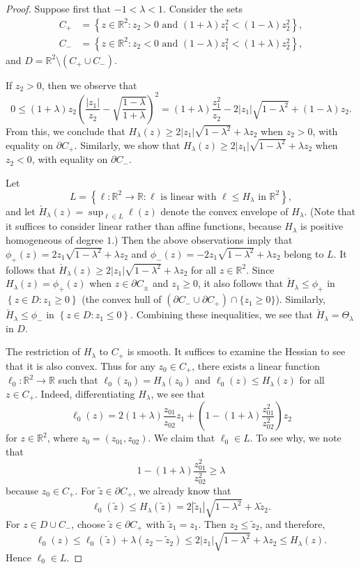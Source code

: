 \documentclass[a4paper]{article}
\newcommand{\R}{\mathbb{R}}
\newcommand{\set}[2]{\left\{ #1 \colon #2 \right\}}
\theoremstyle{definition}
\theoremstyle{remark}
\begin{document}
\begin{proof}
Suppose first that $-1 < \lambda < 1$. Consider the sets
\begin{align*}
C_+ & = \set{z \in \R^2}{z_2 > 0 \text{ and }(1 + \lambda) z_1^2 < (1 - \lambda) z_2^2}, \\
C_- & = \set{z \in \R^2}{z_2 < 0 \text{ and } (1 - \lambda) z_1^2 < (1 + \lambda) z_2^2},
\end{align*}
and $D = \R^2 \setminus (C_+ \cup C_-)$.

If $z_2 > 0$, then we observe that
\[
0 \le (1 + \lambda) z_2 \left(\frac{|z_1|}{z_2} - \sqrt{\frac{1 - \lambda}{1 + \lambda}}\right)^2 = (1 + \lambda) \frac{z_1^2}{z_2} - 2|z_1| \sqrt{1 - \lambda^2} + (1 - \lambda)z_2.
\]
From this, we conclude that
$H_\lambda(z) \ge 2|z_1|\sqrt{1 - \lambda^2} + \lambda z_2$ when $z_2 > 0$,
with equality on $\partial C_+$.
Similarly, we show that
$H_\lambda(z) \ge 2|z_1|\sqrt{1 - \lambda^2} + \lambda z_2$ when $z_2 < 0$,
with equality on $\partial C_-$.

Let
\[
L = \set{\ell \colon \R^2 \to \R}{\ell \text{ is linear with } \ell \le H_\lambda \text{ in } \R^2},
\]
and let $\check{H}_\lambda(z) = \sup_{\ell \in L} \ell(z)$
denote the convex envelope of $H_\lambda$. (Note that it suffices to consider
linear rather than affine functions, because $H_\lambda$ is positive homogeneous of degree $1$.)
Then the above observations imply that $\phi_+(z) = 2z_1 \sqrt{1 - \lambda^2} + \lambda z_2$ and $\phi_-(z) = -2z_1 \sqrt{1 - \lambda^2} + \lambda z_2$
belong to $L$. It follows that $\check{H}_\lambda(z) \ge 2|z_1|\sqrt{1 - \lambda^2} + \lambda z_2$ for all $z \in \R^2$.
Since $H_\lambda(z) = \phi_+(z)$ when $z \in \partial C_{\pm}$ and $z_1 \ge 0$,
it also follows that $\check{H}_\lambda \le \phi_+$ in $\set{z \in D}{z_1 \ge 0}$ (the convex hull of
$(\partial C_- \cup \partial C_+) \cap \{z_1 \ge 0\}$). Similarly,
$\check{H}_\lambda \le \phi_-$ in $\set{z \in D}{z_1 \le 0}$.
Combining these inequalities, we see that $\check{H}_\lambda = \Theta_\lambda$ in $D$.

The restriction of $H_\lambda$ to $C_+$ is smooth. It suffices to examine the
Hessian to see that it is also convex. Thus for any $z_0 \in C_+$, there
exists a linear function $\ell_0 \colon \R^2 \to \R$ such that
$\ell_0(z_0) = H_\lambda(z_0)$ and $\ell_0(z) \le H_\lambda(z)$ for all
$z \in C_+$. Indeed, differentiating $H_\lambda$, we see that
\[
\ell_0(z) = 2(1 + \lambda) \frac{z_{01}}{z_{02}} z_1 + \left(1 - (1 + \lambda) \frac{z_{01}^2}{z_{02}^2}\right) z_2
\]
for $z \in \R^2$, where $z_0 = (z_{01}, z_{02})$. We claim that $\ell_0 \in L$. To see why,
we note that
\[
1 - (1 + \lambda) \frac{z_{01}^2}{z_{02}^2} \ge \lambda
\]
because $z_0 \in C_+$. For $\tilde{z} \in \partial C_+$, we already know that
\[
\ell_0(\tilde{z}) \le H_\lambda(\tilde{z}) = 2|\tilde{z}_1| \sqrt{1 - \lambda^2} + \lambda \tilde{z}_2.
\]
For $z \in D \cup C_-$, choose $\tilde{z} \in \partial C_+$ with $\tilde{z}_1 = z_1$. Then
$z_2 \le \tilde{z}_2$, and therefore,
\[
\ell_0(z) \le \ell_0(\tilde{z}) + \lambda(z_2 - \tilde{z}_2)  \le 2|z_1| \sqrt{1 - \lambda^2} + \lambda z_2 \le H_\lambda(z).
\]
Hence $\ell_0 \in L$.


\end{proof}
\end{document}
